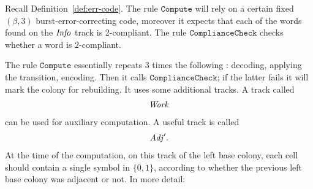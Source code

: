 \documentclass[11pt]{memoir}
\theoremstyle{definition} %
\newcommand{\fld}[1]{\ensuremath{\textit{#1\/}}}
\newcommand{\rul}[1]{\ensuremath{\texttt{#1}}}
\newcommand{\Adj}{\fld{Adj}}
\newcommand{\Info}{\fld{Info}}
\newcommand{\Work}{\fld{Work}}
\newcommand{\Comp}{\rul{Compute}}
\begin{document}
Recall Definition~\ref{def:err-code}.
The rule \( \Comp \) will rely on a certain fixed \( (\beta,3) \) burst-error-correcting
code, moreover
it expects that each of the words found on the \( \Info \) track
is 2-compliant.  %
The rule \( \rul{ComplianceCheck} \) checks whether a word is \( 2 \)-compliant.

The rule \( \Comp \) essentially repeats 3 times %
the following : decoding, applying the transition, encoding.
Then it calls \( \rul{ComplianceCheck} \); if the latter fails
it will mark the colony for rebuilding.
It uses some additional tracks.
A track called
\begin{align*}
   \Work
 \end{align*}
can be used for auxiliary computation.
A useful track is called
\begin{align*}
   \Adj'.
\end{align*}
At the time of the computation, on this track of the left base colony, each cell
should contain a single symbol in \( \{ 0, 1 \} \), according to whether the
previous left base colony was adjacent or not.
In more detail:
\end{document}
